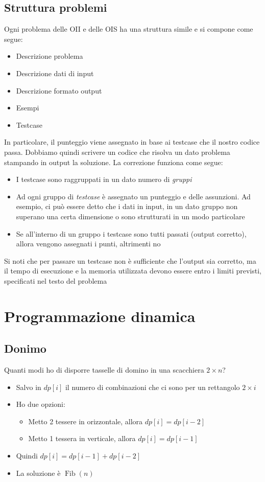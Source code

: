 \subsection{Struttura problemi}
Ogni problema delle OII e delle OIS ha una struttura simile e si compone come segue:
\begin{itemize}
	\item Descrizione problema
	\item Descrizione dati di input
	\item Descrizione formato output
	\item Esempi
	\item Testcase
\end{itemize}
In particolare, il punteggio viene assegnato in base ai testcase che il nostro codice passa. Dobbiamo quindi scrivere un codice che risolva un dato problema stampando in output la soluzione. La correzione funziona come segue:
\begin{itemize}
	\item I testcase sono raggruppati in un dato numero di \textit{gruppi}
	\item Ad ogni gruppo di \textit{testcase} è assegnato un punteggio e delle assunzioni. Ad esempio, ci può essere detto che i dati in input, in un dato gruppo non superano una certa dimensione o sono strutturati in un modo particolare
	\item Se all'interno di un gruppo i testcase sono tutti passati (output corretto), allora vengono assegnati i punti, altrimenti no
\end{itemize}
Si noti che per passare un testcase non è sufficiente che l'output sia corretto, ma il tempo di esecuzione e la memoria utilizzata devono essere entro i limiti previsti, specificati nel testo del problema

\section{Programmazione dinamica}

\subsection{Donimo}
Quanti modi ho di disporre tasselle di domino in una scacchiera $ 2 \times n $?

\vskip3mm\vskip3mm
\begin{itemize}
	\item Salvo in $ dp\left[i\right] $ il numero di combinazioni che ci sono per un rettangolo $ 2 \times i $
	\item Ho due opzioni:
	      \begin{itemize}
		      \item Metto 2 tessere in orizzontale, allora $ dp\left[i\right] = dp\left[i-2\right] $
		      \item Metto 1 tessera in verticale, allora $ dp\left[i\right] = dp\left[i-1\right] $
	      \end{itemize}
	\item Quindi $ dp\left[i\right] = dp\left[i-1\right] + dp\left[i-2\right] $
	\item La soluzione è $ \operatorname{Fib}\left(n\right) $
\end{itemize}
